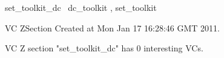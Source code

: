\documentclass{article}
\begin{document}

\begin{zsection}
	 \SECTION set\_toolkit\_dc \parents~dc\_toolkit , set\_toolkit
\end{zsection}

\newcommand{\appliesTo}{\zbinop{appliesTo}} 
\newcommand{\appliesToNofix}{\zpreop{appliesToNofix}} 

VC ZSection Created at Mon Jan 17 16:28:46 GMT 2011.



 VC Z section "set_toolkit_dc" has $0$ interesting VCs.



\end{document}
